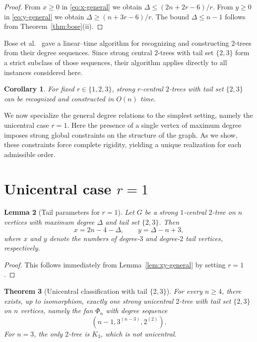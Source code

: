 \documentclass[12pt]{article}
\newtheorem{theorem}{Theorem}[section]
\newtheorem{lemma}[theorem]{Lemma}
\newtheorem{corollary}[theorem]{Corollary}
\numberwithin{equation}{section}
\begin{document}
\begin{proof}
From $x\ge0$ in \eqref{eq:x-general} we obtain
$\Delta\le (2n+2r-6)/r$.
From $y\ge0$ in \eqref{eq:y-general} we obtain
$\Delta\ge (n+3r-6)/r$.
The bound $\Delta\le n-1$ follows from Theorem~\ref{thm:bose}(ii).
\end{proof}


Bose et al.~\cite{bose2008} gave a linear--time algorithm for recognizing and constructing $2$-trees from their degree sequences.
Since strong central $2$-trees with tail set $\{2,3\}$ form a strict subclass of those sequences, their algorithm applies directly to all instances considered here.
\begin{corollary}
For fixed $r\in\{1,2,3\}$, strong $r$-central $2$-trees with tail set $\{2,3\}$ can be recognized and constructed in $O(n)$ time.
\end{corollary}

We now specialize the general degree relations to the simplest setting, namely the unicentral case $r=1$. Here the presence of a single vertex of maximum degree imposes strong global constraints on the structure of the graph. As we show, these constraints force complete rigidity, yielding a unique realization for each admissible order.

\section{Unicentral case \texorpdfstring{$r=1$}{r=1}}


\begin{lemma}[Tail parameters for $r=1$]
\label{lem:r1-xy}
Let $G$ be a strong $1$-central $2$-tree on $n$ vertices with maximum degree
$\Delta$ and tail set $\{2,3\}$. Then
\[
x = 2n-4-\Delta, \qquad y = \Delta-n+3,
\]
where $x$ and $y$ denote the numbers of degree-$3$ and degree-$2$ tail vertices,
respectively.
\end{lemma}

\begin{proof}
This follows immediately from Lemma~\ref{lem:xy-general} by setting $r=1$.
\end{proof}

\begin{theorem}[Unicentral classification with tail $\{2,3\}$]
\label{thm:uni23}
For every $n\ge 4$, there exists, up to isomorphism, exactly one strong unicentral
$2$-tree with tail set $\{2,3\}$ on $n$ vertices, namely the fan $\Phi_n$ with
degree sequence
\[
(n-1, 3^{(n-3)}, 2^{(2)}).
\]
For $n=3$, the only $2$-tree is $K_3$, which is not unicentral.
\end{theorem}
\end{document}

